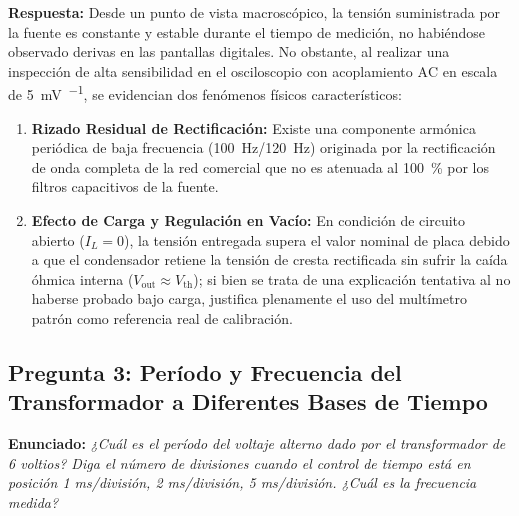 \begin{appendices}
\textbf{Respuesta:} Desde un punto de vista macroscópico, la tensión suministrada por la fuente es constante y estable durante el tiempo de medición, no habiéndose observado derivas en las pantallas digitales. No obstante, al realizar una inspección de alta sensibilidad en el osciloscopio con acoplamiento $\text{AC}$ en escala de \qty{5}{\milli\volt\per\division}, se evidencian dos fenómenos físicos característicos:
\begin{enumerate}
    \item \textbf{Rizado Residual de Rectificación:} Existe una componente armónica periódica de baja frecuencia (\qty{100}{\hertz}/\qty{120}{\hertz}) originada por la rectificación de onda completa de la red comercial que no es atenuada al \qty{100}{\percent} por los filtros capacitivos de la fuente.
    \item \textbf{Efecto de Carga y Regulación en Vacío:} En condición de circuito abierto ($I_L = 0$), la tensión entregada supera el valor nominal de placa debido a que el condensador retiene la tensión de cresta rectificada sin sufrir la caída óhmica interna ($V_{\text{out}} \approx V_{\text{th}}$); si bien se trata de una explicación tentativa al no haberse probado bajo carga, justifica plenamente el uso del multímetro patrón como referencia real de calibración.
\end{enumerate}

\subsection{Pregunta 3: Período y Frecuencia del Transformador a Diferentes Bases de Tiempo}
\textbf{Enunciado:} \textit{¿Cuál es el período del voltaje alterno dado por el transformador de 6 voltios? Diga el número de divisiones cuando el control de tiempo está en posición 1 ms/división, 2 ms/división, 5 ms/división. ¿Cuál es la frecuencia medida?}


\end{appendices}

